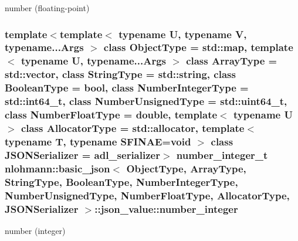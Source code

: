 number (floating-\/point) 

\subsubsection[{\texorpdfstring{number\+\_\+integer}{number_integer}}]{\setlength{\rightskip}{0pt plus 5cm}template$<$template$<$ typename U, typename V, typename...\+Args $>$ class Object\+Type = std\+::map, template$<$ typename U, typename...\+Args $>$ class Array\+Type = std\+::vector, class String\+Type  = std\+::string, class Boolean\+Type  = bool, class Number\+Integer\+Type  = std\+::int64\+\_\+t, class Number\+Unsigned\+Type  = std\+::uint64\+\_\+t, class Number\+Float\+Type  = double, template$<$ typename U $>$ class Allocator\+Type = std\+::allocator, template$<$ typename T, typename S\+F\+I\+N\+A\+E=void $>$ class J\+S\+O\+N\+Serializer = adl\+\_\+serializer$>$ {\bf number\+\_\+integer\+\_\+t} {\bf nlohmann\+::basic\+\_\+json}$<$ Object\+Type, Array\+Type, String\+Type, Boolean\+Type, Number\+Integer\+Type, Number\+Unsigned\+Type, Number\+Float\+Type, Allocator\+Type, J\+S\+O\+N\+Serializer $>$\+::json\+\_\+value\+::number\+\_\+integer}\hypertarget{unionnlohmann_1_1basic__json_1_1json__value_afa3c414445aeffb56a7c6926f9420941}{}\label{unionnlohmann_1_1basic__json_1_1json__value_afa3c414445aeffb56a7c6926f9420941}


number (integer) 

